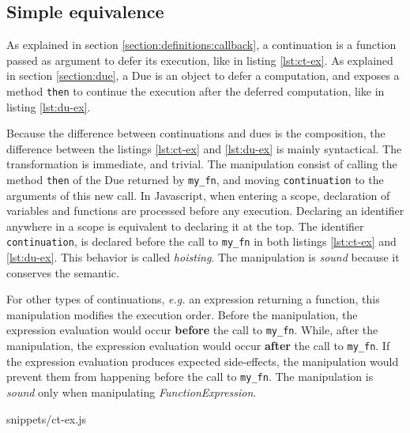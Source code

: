 
\subsection{Simple equivalence} \label{section:equivalences:general}

As explained in section \ref{section:definitions:callback}, a continuation is a function passed as argument to defer its execution, like in listing \ref{lst:ct-ex}.
As explained in section \ref{section:due}, a Due is an object to defer a computation, and exposes a method \texttt{then} to continue the execution after the deferred computation, like in listing \ref{lst:du-ex}.

Because the difference between continuations and dues is the composition, the difference between the listings \ref{lst:ct-ex} and \ref{lst:du-ex} is mainly syntactical.
The transformation is immediate, and trivial.
The manipulation consist of calling the method \texttt{then} of the Due returned by \texttt{my_fn}, and moving \texttt{continuation} to the arguments of this new call.
In Javascript, when entering a scope, declaration of variables and functions are processed before any execution.
Declaring an identifier anywhere in a scope is equivalent to declaring it at the top.
The identifier \texttt{continuation}, is declared before the call to \texttt{my_fn} in both listings \ref{lst:ct-ex} and \ref{lst:du-ex}.
This behavior is called \textit{hoisting}.
The manipulation is \textit{sound} because it conserves the semantic.%

For other types of continuations, \textit{e.g.} an expression returning a function, this manipulation modifies the execution order.
Before the manipulation, the expression evaluation would occur \textbf{before} the call to \texttt{my_fn}.
While, after the manipulation, the expression evaluation would occur \textbf{after} the call to \texttt{my_fn}.
If the expression evaluation produces expected side-effects, the manipulation would prevent them from happening before the call to \texttt{my_fn}.
The manipulation is \textit{sound} only when manipulating \textit{FunctionExpression}.

             {snippets/ct-ex.js}


